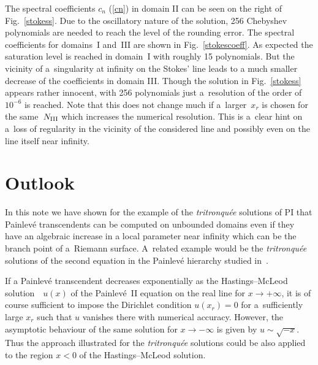 \documentclass[pdftex]{sigma}
\begin{document}
The spectral coefficients $c_{n}$ (\ref{cn}) in domain II can be seen on the right of Fig.~\ref{stokess}. Due to the oscillatory nature of the solution, 256 Chebyshev polynomials are needed to reach the level of the rounding error. The spectral coefficients for domains~I and~III are shown in Fig.~\ref{stokescoeff}. As expected the saturation level is reached in domain~I with roughly 15 polynomials. But the vicinity of a~singularity at infinity on the Stokes' line leads to a much smaller decrease of the coefficients in domain III. Though the solution in Fig.~\ref{stokess} appears rather innocent, with 256 polynomials just a~resolution of the order of $10^{-6}$ is reached. Note that this does not change much if a~larger~$x_{r}$ is chosen for the same~$N_{\rm III}$ which increases the numerical resolution. This is a~clear hint on a~loss of regularity in the vicinity of the considered line and possibly even on the line itself near infinity.

\section{Outlook}\label{section4}
In this note we have shown for the example of the \emph{tritronqu\'ee} solutions of PI that Painlev\'e transcendents can be computed on unbounded domains even if they have an algebraic increase in a local parameter near infinity which can be the branch point of a~Riemann surface. A~related example would be the \emph{tritronqu\'ee} solutions of the second equation in the Painlev\'e hierarchy studied in~\cite{GKK}.

If a Painlev\'e transcendent decreases exponentially as the Hastings--McLeod solution~\cite{HM}~$u(x)$ of the Painlev\'e~II equation on the real line for $x\to+\infty$, it is of course sufficient to impose the Dirichlet condition $u(x_{r})=0$ for a~sufficiently large $x_{r}$ such that $u$ vanishes there with numerical accuracy. However, the asymptotic behaviour of the same solution for $x\to-\infty$ is given by $u\sim \sqrt{-x}$. Thus the approach illustrated for the \emph{tritronqu\'ee} solutions could be also applied to the region $x<0$ of the Hastings--McLeod solution.
\end{document}

